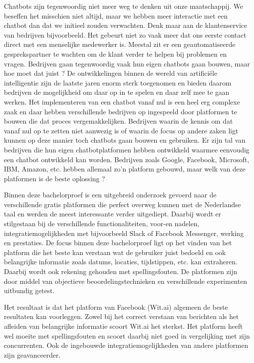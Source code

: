 Chatbots zijn tegenwoordig niet meer weg te denken uit onze maatschappij. We beseffen het misschien niet altijd, maar we hebben meer interactie met een chatbot dan dat we initieel zouden verwachten. Denk maar aan de klantenservice van bedrijven bijvoorbeeld. Het gebeurt niet zo vaak meer dat ons eerste contact direct met een menselijke medewerker is. Meestal zit er een geautomatiseerde gesprekspartner te wachten om de klant verder te helpen bij problemen en vragen. Bedrijven gaan tegenwoordig vaak hun eigen chatbots gaan bouwen, maar hoe moet dat juist ? De ontwikkelingen binnen de wereld van artificiële intelligentie zijn de laatste jaren enorm sterk toegenomen en bieden daarom bedrijven de mogelijkheid om daar op in te spelen en daar zelf mee te gaan werken. Het implementeren van een chatbot vanaf nul is een heel erg complexe zaak en daar hebben verschillende bedrijven op ingespeeld door platformen te bouwen die dat proces vergemakkelijken. Bedrijven waarin de kennis om dat vanaf nul op te zetten niet aanwezig is of waarin de focus op andere zaken ligt kunnen op deze manier toch chatbots gaan bouwen en gebruiken. Er zijn tal van bedrijven die hun eigen chatbotplatformen hebben ontwikkeld waarmee eenvoudig een chatbot ontwikkeld kan worden. Bedrijven zoals Google, Facebook, Microsoft, IBM, Amazon, etc. hebben allemaal zo’n platform gebouwd, maar welk van deze platformen is de beste oplossing ?

Binnen deze bachelorproef is een uitgebreid onderzoek gevoerd naar de verschillende gratis platformen die perfect overweg kunnen met de Nederlandse taal en werden de meest interessante verder uitgediept. Daarbij wordt er stilgestaan bij de verschillende functionaliteiten, voor-en nadelen, integratiemogelijkheden met bijvoorbeeld Slack of Facebook Messenger, werking en prestaties. De focus binnen deze bachelorproef ligt op het vinden van het platform die het beste kan verstaan wat de gebruiker juist bedoeld en ook belangrijke informatie zoals datums, locaties, tijdstippen, etc. kan extraheren. Daarbij wordt ook rekening gehouden met spellingsfouten. De platformen zijn door middel van objectieve beoordelingstechnieken en verschillende experimenten uitbundig getest. 

Het resultaat is dat het platform van Facebook (Wit.ai) algemeen de beste resultaten kan voorleggen. Zowel bij het correct verstaan van berichten als het afleiden van belangrijke informatie scoort Wit.ai het sterkst. Het platform heeft wel moeite met spellingsfouten en scoort daarbij niet goed in vergelijking met zijn concurrenten. Ook de ingebouwde integratiemogelijkheden van andere platformen zijn geavanceerder.

